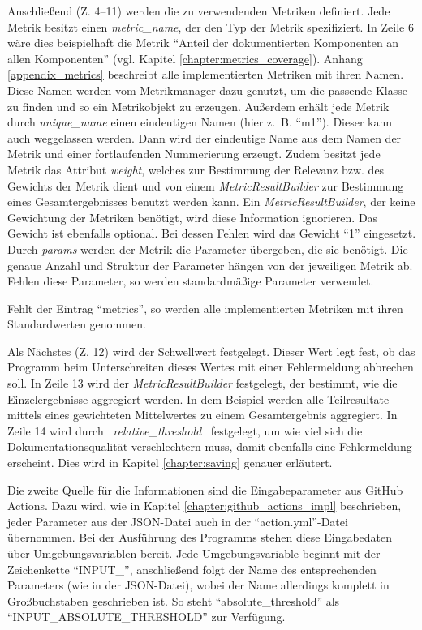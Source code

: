 Anschließend (Z. 4--11) werden die zu verwendenden Metriken definiert. Jede Metrik besitzt einen \textit{metric\_name}, der den Typ der Metrik spezifiziert. In Zeile 6 wäre dies beispielhaft die Metrik \enquote{Anteil der dokumentierten Komponenten an allen Komponenten} (vgl. Kapitel \ref{chapter:metrics_coverage}). Anhang  \ref{appendix_metrics} beschreibt alle implementierten Metriken mit ihren Namen. Diese Namen werden vom Metrikmanager dazu genutzt, um die passende Klasse zu finden und so ein Metrikobjekt zu erzeugen. Außerdem erhält jede Metrik durch \textit{unique\_name} einen eindeutigen Namen (hier z.~B. \enquote{m1}). Dieser kann auch weggelassen werden. Dann wird der eindeutige Name aus dem Namen der Metrik und einer fortlaufenden Nummerierung erzeugt. Zudem besitzt jede Metrik das Attribut \textit{weight}, welches zur Bestimmung der Relevanz bzw. des Gewichts der Metrik dient und von einem \textit{MetricResultBuilder} zur Bestimmung eines Gesamtergebnisses benutzt werden kann. Ein \textit{MetricResultBuilder}, der keine Gewichtung der Metriken benötigt, wird diese Information ignorieren. Das Gewicht ist ebenfalls optional. Bei dessen Fehlen wird das Gewicht \enquote{1} eingesetzt.  Durch \textit{params}  werden der Metrik die Parameter übergeben, die sie benötigt. Die genaue Anzahl und Struktur der Parameter hängen von der jeweiligen Metrik ab. Fehlen diese Parameter, so werden standardmäßige Parameter verwendet.

Fehlt der Eintrag \enquote{metrics}, so werden alle implementierten Metriken mit ihren Standardwerten genommen.

Als Nächstes (Z. 12) wird der Schwellwert festgelegt. Dieser Wert legt fest, ob das Programm beim Unterschreiten dieses Wertes mit einer Fehlermeldung abbrechen soll. In Zeile 13 wird der \textit{MetricResultBuilder} festgelegt, der bestimmt, wie die Einzelergebnisse aggregiert werden. In dem Beispiel werden alle Teilresultate mittels eines gewichteten Mittelwertes zu einem Gesamtergebnis aggregiert.  In Zeile 14 wird durch \mbox{\textit{ relative\_threshold }} festgelegt, um wie viel sich die Dokumentationsqualität verschlechtern muss, damit ebenfalls eine Fehlermeldung erscheint. Dies wird in Kapitel \ref{chapter:saving} genauer erläutert.



\bigskip
Die zweite Quelle für die Informationen sind die Eingabeparameter aus GitHub Actions. Dazu wird, wie in Kapitel \ref{chapter:github_actions_impl} beschrieben, jeder Parameter aus der \ac{JSON}-Datei auch in der \enquote{action.yml}-Datei übernommen. Bei der Ausführung des Programms stehen diese Eingabedaten über Umgebungsvariablen bereit. Jede Umgebungsvariable beginnt mit der Zeichenkette \enquote{INPUT\_}, anschließend folgt der Name des entsprechenden Parameters (wie in der \ac{JSON}-Datei), wobei der Name allerdings komplett in Großbuchstaben geschrieben ist. So steht  \enquote{absolute\_threshold} als \enquote{INPUT\_ABSOLUTE\_THRESHOLD} zur Verfügung.


